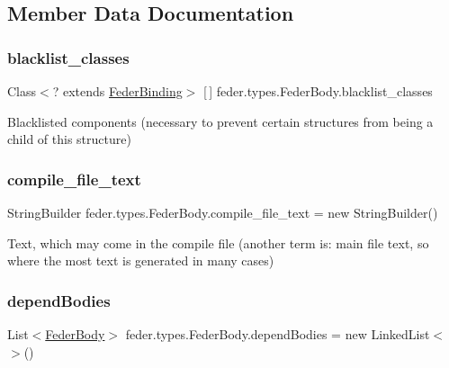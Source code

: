 \subsection{Member Data Documentation}
\mbox{\label{classfeder_1_1types_1_1FederBody_a0408b11249a7eaa41bd71fdfba5bbfb9}} 
\subsubsection{\texorpdfstring{blacklist\+\_\+classes}{blacklist\_classes}}
{\footnotesize\ttfamily Class$<$? extends \hyperlink{classfeder_1_1types_1_1FederBinding}{Feder\+Binding}$>$ \mbox{[}$\,$\mbox{]} feder.\+types.\+Feder\+Body.\+blacklist\+\_\+classes\hspace{0.3cm}{\ttfamily [protected]}}

Blacklisted components (necessary to prevent certain structures from being a child of this structure) \mbox{\label{classfeder_1_1types_1_1FederBody_a4735b22113042ca2cb86572c6b982e25}} 
\subsubsection{\texorpdfstring{compile\+\_\+file\+\_\+text}{compile\_file\_text}}
{\footnotesize\ttfamily String\+Builder feder.\+types.\+Feder\+Body.\+compile\+\_\+file\+\_\+text = new String\+Builder()}

Text, which may come in the compile file (another term is\+: main file text, so where the most text is generated in many cases) \mbox{\label{classfeder_1_1types_1_1FederBody_a833aa456985af005fa923bc8771cca7a}} 
\subsubsection{\texorpdfstring{depend\+Bodies}{dependBodies}}
{\footnotesize\ttfamily List$<$\hyperlink{classfeder_1_1types_1_1FederBody}{Feder\+Body}$>$ feder.\+types.\+Feder\+Body.\+depend\+Bodies = new Linked\+List$<$$>$()}

